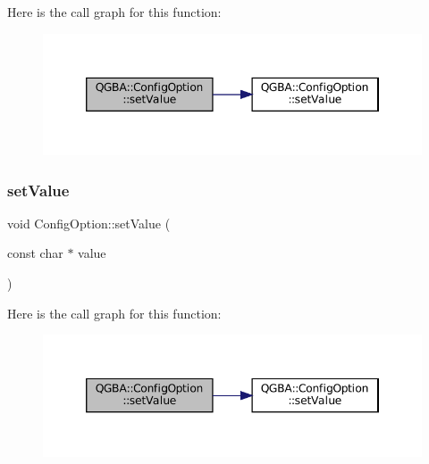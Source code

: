 Here is the call graph for this function\+:
\nopagebreak
\begin{figure}[H]
\begin{center}
\leavevmode
\includegraphics[width=346pt]{class_q_g_b_a_1_1_config_option_a2b7c4b60aa27d09db06b13e73565991e_cgraph}
\end{center}
\end{figure}
\mbox{\label{class_q_g_b_a_1_1_config_option_a1d04fcf2f4a620fc582b0da1156699e6}} 
\subsubsection{\texorpdfstring{set\+Value}{setValue}\hspace{0.1cm}{\footnotesize\ttfamily [4/5]}}
{\footnotesize\ttfamily void Config\+Option\+::set\+Value (\begin{DoxyParamCaption}\item[{const char $\ast$}]{value }\end{DoxyParamCaption})\hspace{0.3cm}{\ttfamily [slot]}}

Here is the call graph for this function\+:
\nopagebreak
\begin{figure}[H]
\begin{center}
\leavevmode
\includegraphics[width=346pt]{class_q_g_b_a_1_1_config_option_a1d04fcf2f4a620fc582b0da1156699e6_cgraph}
\end{center}
\end{figure}
\mbox{\label{class_q_g_b_a_1_1_config_option_a18dc4971608d3519c0fbb69bfa6590fb}} 
